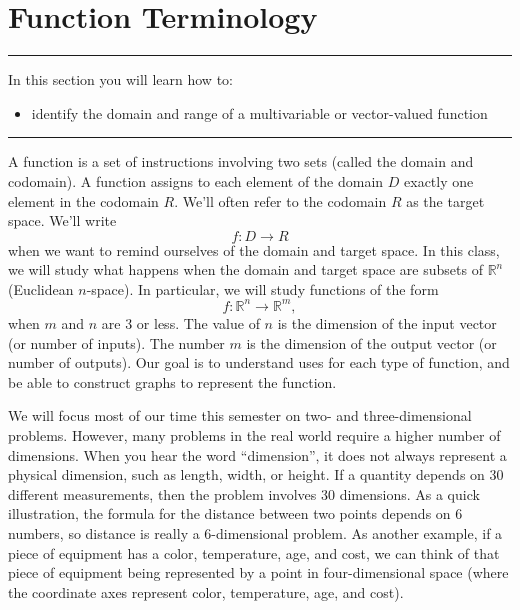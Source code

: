 \documentclass[10pt,]{book}
\theoremstyle{plain}
\theoremstyle{definition}
\theoremstyle{definition}
\theoremstyle{definition}
\theoremstyle{definition}
\newenvironment{objectives}[1]{\noindent\rule{\linewidth}{0.1ex}\newline{\textbf{{\large#1}}\par\smallskip}}{\par\noindent\rule{\linewidth}{0.1ex}\par\smallskip}
\theoremstyle{definition}
\numberwithin{equation}{section}
\begin{document}
\section[{Function Terminology}]{Function Terminology}\label{ch06_01_terminology}
\begin{objectives}{Objectives}\label{objectives-10}
In this section you will learn how to:%
%
\begin{itemize}[label=\textbullet]
\item{}identify the domain and range of a multivariable or vector-valued function%
\end{itemize}
\end{objectives}
A function is a set of instructions involving two sets (called the domain and codomain). A function assigns to each element of the domain \(D\) exactly one element in the codomain \(R\). We'll often refer to the codomain \(R\) as the target space. We'll write%
\begin{equation*}
f\colon D\to R
\end{equation*}
when we want to remind ourselves of the domain and target space. In this class, we will study what happens when the domain and target space are subsets of \({\mathbb{R}}^n\) (Euclidean \(n\)-space). In particular, we will study functions of the form%
\begin{equation*}
f\colon {\mathbb{R}}^n\to {\mathbb{R}}^m,
\end{equation*}
when \(m\) and \(n\) are 3 or less. The value of \(n\) is the dimension of the input vector (or number of inputs). The number \(m\) is the dimension of the output vector (or number of outputs). Our goal is to understand uses for each type of function, and be able to construct graphs to represent the function.%
\par
We will focus most of our time this semester on two- and three-dimensional problems. However, many problems in the real world require a higher number of dimensions. When you hear the word ``dimension'', it does not always represent a physical dimension, such as length, width, or height. If a quantity depends on 30 different measurements, then the problem involves 30 dimensions. As a quick illustration, the formula for the distance between two points depends on 6 numbers, so distance is really a 6-dimensional problem. As another example, if a piece of equipment has a color, temperature, age, and cost, we can think of that piece of equipment being represented by a point in four-dimensional space (where the coordinate axes represent color, temperature, age, and cost).%
\end{document}
